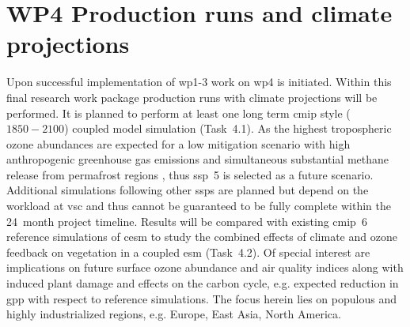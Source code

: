 \section{WP4 Production runs and climate projections}
\label{sec:wp4}
Upon successful implementation of \gls{wp}1-3 work on \gls{wp}4 is initiated. Within this final research work package production runs with climate projections will be performed. It is planned to perform at least one long term \gls{cmip} style ($1850-2100$) coupled model simulation (Task~4.1). As the highest tropospheric ozone abundances are expected for a low mitigation scenario with high anthropogenic greenhouse gas emissions and simultaneous substantial methane release from permafrost regions \parencites[e.g.][]{JGR:Rieder2015}{AE:Rieder2018}, thus \gls{ssp}~5 is selected as a future scenario. Additional simulations following other \glspl{ssp} are planned but depend on the workload at \gls{vsc} and thus cannot be guaranteed to be fully complete within the 24~month project timeline. Results will be compared with existing \gls{cmip}~6 reference simulations of \gls{cesm} to study the combined effects of climate and ozone feedback on vegetation in a coupled \gls{esm} (Task~4.2). Of special interest are implications on future surface ozone abundance and air quality indices along with induced plant damage and effects on the carbon cycle, e.g. expected reduction in \gls{gpp} with respect to reference simulations. The focus herein lies on populous and highly industrialized regions, e.g. Europe, East Asia, North America.

